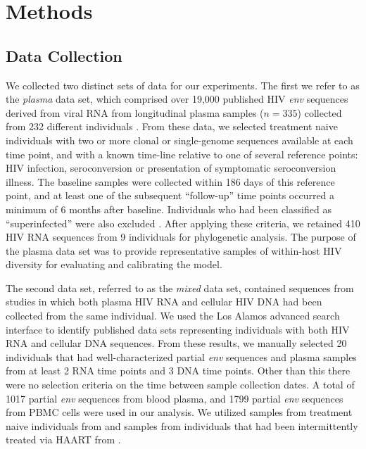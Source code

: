 \documentclass[12pt]{article}
\begin{document}

\section * {Methods} \label{sec:methods}



\subsection * {Data Collection} \label{subsec:dcollection}
We collected two distinct sets of data for our experiments. 
The first we refer to as the {\em plasma} data set, which comprised over 19,000 published HIV \textit{env} sequences derived from viral RNA from longitudinal plasma samples ($n=335$) collected from 232 different individuals \citep{McCloskey14}. 
From these data, we selected treatment naive individuals with two or more clonal or single-genome sequences available at each time point, and with a known time-line relative to one of several reference points: HIV infection, seroconversion or presentation of symptomatic seroconversion illness. 
The baseline samples were collected within 186 days of this reference point, and at least one of the subsequent ``follow-up'' time points occurred a minimum of 6 months after baseline.
Individuals who had been classified as ``superinfected'' were also excluded \citep{McCloskey14}.
After applying these criteria, we retained 410 HIV RNA sequences from 9 individuals for phylogenetic analysis.
The purpose of the plasma data set was to provide representative samples of within-host HIV diversity for evaluating and calibrating the model.

The second data set, referred to as the {\em mixed} data set, contained sequences from studies in which both plasma HIV RNA and cellular HIV DNA had been collected from the same individual.
We used the Los Alamos advanced search interface \citep{LosAlamos} to identify published data sets representing individuals with both HIV RNA and cellular DNA sequences.
From these results, we manually selected 20 individuals that had well-characterized partial {\em env} sequences and plasma samples from at least 2 RNA time points and 3 DNA time points. 
Other than this there were no selection criteria on the time between sample collection dates. 
A total of 1017 partial {\em env} sequences from blood plasma, and 1799 partial {\em env} sequences from PBMC cells were used in our analysis. 
We utilized samples from treatment naive individuals from \cite{Shankarappa99, Novitsky09} and samples from individuals that had been intermittently treated via HAART from \cite{Llewellyn06,Fischer04}. 
\end{document}
